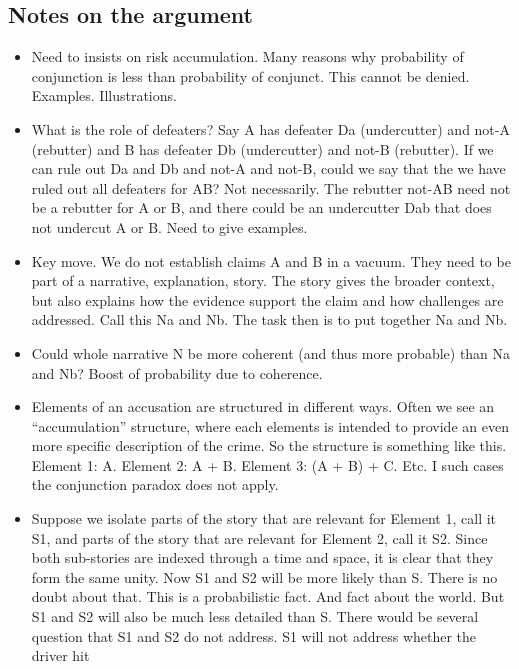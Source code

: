 \documentclass[
  10pt,
  dvipsnames,enabledeprecatedfontcommands]{scrartcl}
\begin{document}
\hypertarget{notes-on-the-argument}{%
\subsection{Notes on the argument}\label{notes-on-the-argument}}

\begin{itemize}
\item
  Need to insists on risk accumulation. Many reasons why probability of
  conjunction is less than probability of conjunct. This cannot be
  denied. Examples. Illustrations.
\item
  What is the role of defeaters? Say A has defeater Da (undercutter) and
  not-A (rebutter) and B has defeater Db (undercutter) and not-B
  (rebutter). If we can rule out Da and Db and not-A and not-B, could we
  say that the we have ruled out all defeaters for AB? Not necessarily.
  The rebutter not-AB need not be a rebutter for A or B, and there could
  be an undercutter Dab that does not undercut A or B. Need to give
  examples.
\item
  Key move. We do not establish claims A and B in a vacuum. They need to
  be part of a narrative, explanation, story. The story gives the
  broader context, but also explains how the evidence support the claim
  and how challenges are addressed. Call this Na and Nb. The task then
  is to put together Na and Nb.
\item
  Could whole narrative N be more coherent (and thus more probable) than
  Na and Nb? Boost of probability due to coherence.
\item
  Elements of an accusation are structured in different ways. Often we
  see an ``accumulation'' structure, where each elements is intended to
  provide an even more specific description of the crime. So the
  structure is something like this. Element 1: A. Element 2: A + B.
  Element 3: (A + B) + C. Etc. I such cases the conjunction paradox does
  not apply.
\item
  Suppose we isolate parts of the story that are relevant for Element 1,
  call it S1, and parts of the story that are relevant for Element 2,
  call it S2. Since both sub-stories are indexed through a time and
  space, it is clear that they form the same unity. Now S1 and S2 will
  be more likely than S. There is no doubt about that. This is a
  probabilistic fact. And fact about the world. But S1 and S2 will also
  be much less detailed than S. There would be several question that S1
  and S2 do not address. S1 will not address whether the driver hit

\end{itemize}
\end{document}
